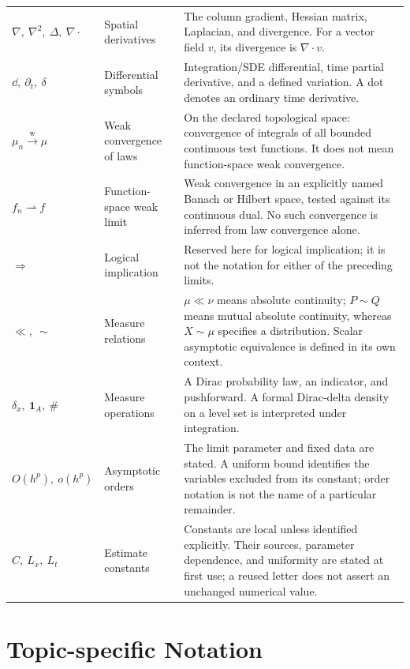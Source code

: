 \begin{longtable}{@{}>{\raggedright\arraybackslash}p{32mm}>{\raggedright\arraybackslash}p{26mm}>{\raggedright\arraybackslash}p{90mm}@{}}
$\nabla,\ \nabla^2,\ \Delta,\ \nabla\cdot$ & Spatial derivatives & The column gradient, Hessian matrix, Laplacian, and divergence. For a vector field $v$, its divergence is $\nabla\cdot v$.\\[3pt]
$\dd,\ \partial_t,\ \delta$ & Differential symbols & Integration/SDE differential, time partial derivative, and a defined variation. A dot denotes an ordinary time derivative.\\[3pt]
$\mu_n\xrightarrow{\mathrm w}\mu$ & Weak convergence of laws & On the declared topological space: convergence of integrals of all bounded continuous test functions. It does not mean function-space weak convergence.\\[3pt]
$f_n\rightharpoonup f$ & Function-space weak limit & Weak convergence in an explicitly named Banach or Hilbert space, tested against its continuous dual. No such convergence is inferred from law convergence alone.\\[3pt]
$\Longrightarrow$ & Logical implication & Reserved here for logical implication; it is not the notation for either of the preceding limits.\\[3pt]
$\ll,\ \sim$ & Measure relations & $\mu\ll\nu$ means absolute continuity; $P\sim Q$ means mutual absolute continuity, whereas $X\sim\mu$ specifies a distribution. Scalar asymptotic equivalence is defined in its own context.\\[3pt]
$\delta_x,\ \mathbf1_A,\ \#$ & Measure operations & A Dirac probability law, an indicator, and pushforward. A formal Dirac-delta density on a level set is interpreted under integration.\\[3pt]
$O(h^p),\ o(h^p)$ & Asymptotic orders & The limit parameter and fixed data are stated. A uniform bound identifies the variables excluded from its constant; order notation is not the name of a particular remainder.\\[3pt]
$C,\ L_x,\ L_t$ & Estimate constants & Constants are local unless identified explicitly. Their sources, parameter dependence, and uniformity are stated at first use; a reused letter does not assert an unchanged numerical value.\\[3pt]
\end{longtable}
\addtocounter{table}{-1}
\endgroup

\section*{Topic-specific Notation}
